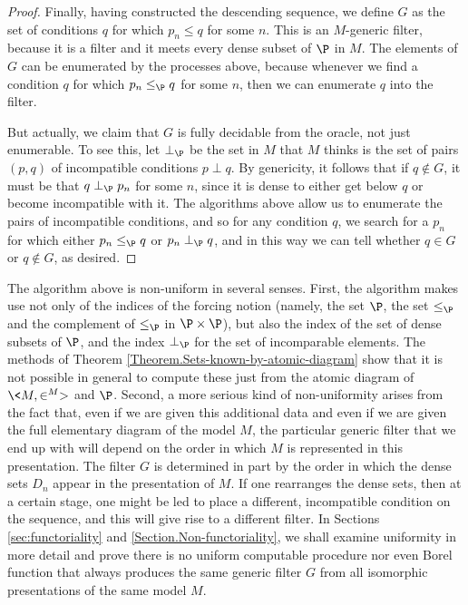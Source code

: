 \documentclass{amsart}
\begin{document}
\begin{proof}
 Finally, having constructed the descending sequence, we define $G$ as the set of conditions $q$ for which $p_n\leq q$ for some $n$. This is an $M$-generic filter, because it is a filter and it meets every dense subset of $\P$ in $M$. The elements of $G$ can be enumerated by the processes above, because whenever we find a condition $q$ for which $p_n\leq_\P q$ for some $n$, then we can enumerate $q$ into the filter.
 
 But actually, we claim that $G$ is fully decidable from the oracle, not just enumerable. To see this, let $\perp_\P$ be the set in $M$ that $M$ thinks is the set of pairs $(p,q)$ of incompatible conditions $p\perp q$. By genericity, it follows that if $q\notin G$, it must be that $q\perp_\P p_n$ for some $n$, since it is dense to either get below $q$ or become incompatible with it. The algorithms above allow us to enumerate the pairs of incompatible conditions, and so for any condition $q$, we search for a $p_n$ for which either $p_n\leq_\P q$ or $p_n\perp_\P q$, and in this way we can tell whether $q\in G$ or $q\notin G$, as desired.
 \end{proof}
 
 The algorithm above is non-uniform in several senses. First, the algorithm makes use not only of the indices
 of the forcing notion (namely, the set $\P$, the set $\leq_{\P}$ and the complement of $\leq_{\P}$ in $\P\times\P$),
 but also the index of the set of dense subsets of $\P$, and the index $\perp_\P$ for the set of incomparable elements. The methods of Theorem \ref{Theorem.Sets-known-by-atomic-diagram} show that it is not possible in general to compute these just from the atomic diagram of $\<M,\in^M>$ and $\P$. Second, a more serious kind of non-uniformity arises from the fact that, even if we are given this additional data and even if we are given the full elementary diagram of the model $M$, the particular generic filter that we end up with will depend on the order in which $M$ is represented in this presentation. The filter $G$ is determined in part by the order in which the dense sets $D_n$ appear in the presentation of $M$. If one rearranges the dense sets, then at a certain stage, one might be led to place a different, incompatible condition on the sequence, and this will give rise to a different filter.
 In Sections \ref{sec:functoriality} and \ref{Section.Non-functoriality}, we shall examine uniformity in more detail and prove there is no uniform computable procedure nor even Borel function that always
 produces the same generic filter $G$ from all isomorphic presentations of the same model $M$.
 
\end{document}
